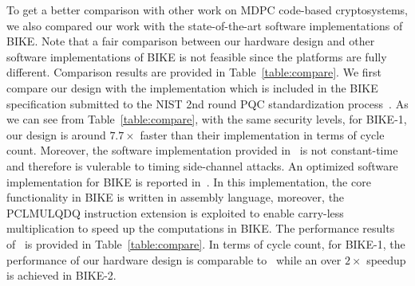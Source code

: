 \documentclass[runningheads]{llncs}
\begin{document}
To get a better comparison with other work on MDPC code-based cryptosystems,
we also compared our work with the state-of-the-art software implementations of BIKE.
Note that a fair comparison between our hardware design and other software implementations
of BIKE is not feasible since the platforms are fully different.
Comparison results are provided in Table~\ref{table:compare}.
We first compare our design with the implementation
which is included in the BIKE specification
submitted to the NIST 2nd round PQC standardization process~\cite{aragon2017bike}.
As we can see from Table~\ref{table:compare}, with the same security levels,
for BIKE-1, our design is around $7.7\times$ faster than their implementation
in terms of cycle count.
Moreover, the software implementation provided in~\cite{aragon2017bike} is not constant-time and
therefore is vulerable to timing side-channel attacks.
An optimized software implementation for BIKE is reported in~\cite{drucker2017toolbox}.
In this implementation,
the core functionality in BIKE is written in assembly language,
moreover, the PCLMULQDQ instruction extension is exploited
to enable carry-less multiplication to speed up
the computations in BIKE.
The performance results of~\cite{drucker2017toolbox}
is provided in Table~\ref{table:compare}.
In terms of cycle count, for BIKE-1, the performance of our hardware design is
comparable to~\cite{drucker2017toolbox} while an over $2\times$
speedup is achieved in BIKE-2.
\end{document}
